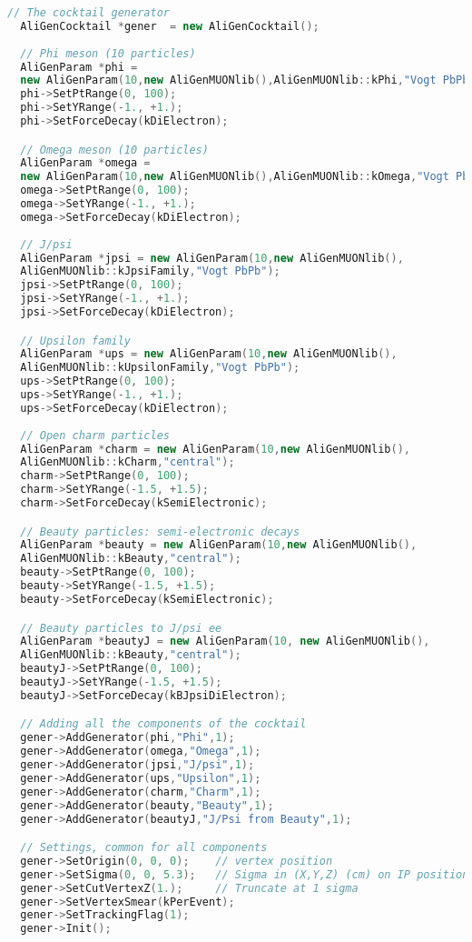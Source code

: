 \documentclass[12pt,a4paper,twoside]{article}
\begin{document}
\begin{lstlisting}[language=C++]
  // The cocktail generator
  AliGenCocktail *gener  = new AliGenCocktail();
  
  // Phi meson (10 particles)
  AliGenParam *phi = 
  new AliGenParam(10,new AliGenMUONlib(),AliGenMUONlib::kPhi,"Vogt PbPb");
  phi->SetPtRange(0, 100);
  phi->SetYRange(-1., +1.);
  phi->SetForceDecay(kDiElectron);

  // Omega meson (10 particles)
  AliGenParam *omega = 
  new AliGenParam(10,new AliGenMUONlib(),AliGenMUONlib::kOmega,"Vogt PbPb");
  omega->SetPtRange(0, 100);
  omega->SetYRange(-1., +1.);
  omega->SetForceDecay(kDiElectron);
  
  // J/psi 
  AliGenParam *jpsi = new AliGenParam(10,new AliGenMUONlib(),
  AliGenMUONlib::kJpsiFamily,"Vogt PbPb");
  jpsi->SetPtRange(0, 100);
  jpsi->SetYRange(-1., +1.);
  jpsi->SetForceDecay(kDiElectron);

  // Upsilon family
  AliGenParam *ups = new AliGenParam(10,new AliGenMUONlib(),
  AliGenMUONlib::kUpsilonFamily,"Vogt PbPb");
  ups->SetPtRange(0, 100);
  ups->SetYRange(-1., +1.);
  ups->SetForceDecay(kDiElectron);
  
  // Open charm particles
  AliGenParam *charm = new AliGenParam(10,new AliGenMUONlib(), 
  AliGenMUONlib::kCharm,"central");
  charm->SetPtRange(0, 100);
  charm->SetYRange(-1.5, +1.5);
  charm->SetForceDecay(kSemiElectronic);

  // Beauty particles: semi-electronic decays
  AliGenParam *beauty = new AliGenParam(10,new AliGenMUONlib(), 
  AliGenMUONlib::kBeauty,"central");
  beauty->SetPtRange(0, 100);
  beauty->SetYRange(-1.5, +1.5);
  beauty->SetForceDecay(kSemiElectronic);

  // Beauty particles to J/psi ee
  AliGenParam *beautyJ = new AliGenParam(10, new AliGenMUONlib(), 
  AliGenMUONlib::kBeauty,"central");
  beautyJ->SetPtRange(0, 100);
  beautyJ->SetYRange(-1.5, +1.5);
  beautyJ->SetForceDecay(kBJpsiDiElectron);

  // Adding all the components of the cocktail
  gener->AddGenerator(phi,"Phi",1);
  gener->AddGenerator(omega,"Omega",1);
  gener->AddGenerator(jpsi,"J/psi",1);
  gener->AddGenerator(ups,"Upsilon",1);
  gener->AddGenerator(charm,"Charm",1);
  gener->AddGenerator(beauty,"Beauty",1);
  gener->AddGenerator(beautyJ,"J/Psi from Beauty",1);

  // Settings, common for all components
  gener->SetOrigin(0, 0, 0);    // vertex position
  gener->SetSigma(0, 0, 5.3);   // Sigma in (X,Y,Z) (cm) on IP position
  gener->SetCutVertexZ(1.);     // Truncate at 1 sigma
  gener->SetVertexSmear(kPerEvent); 
  gener->SetTrackingFlag(1);
  gener->Init();
\end{lstlisting}
\end{document}
